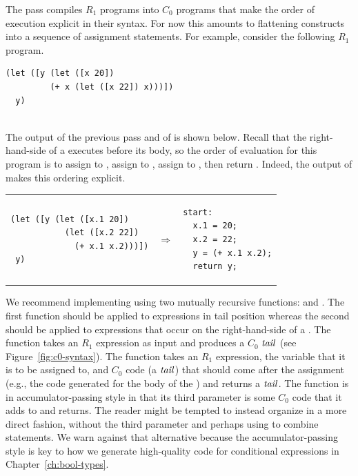 \documentclass[11pt]{book}
\begin{document}
The  pass compiles $R_1$ programs into $C_0$
programs that make the order of execution explicit in their
syntax. For now this amounts to flattening  constructs into a
sequence of assignment statements. For example, consider the following
$R_1$ program.\\
\begin{minipage}{0.96\textwidth}
\begin{lstlisting}
(let ([y (let ([x 20])
         (+ x (let ([x 22]) x)))])
  y)
\end{lstlisting}
\end{minipage}\\
%
The output of the previous pass and of  is
shown below. Recall that the right-hand-side of a  executes
before its body, so the order of evaluation for this program is to
assign  to , assign  to , assign
 to , then return . Indeed, the
output of  makes this ordering explicit.\\
\begin{tabular}{lll}
\begin{minipage}{0.4\textwidth}
\begin{lstlisting}
(let ([y (let ([x.1 20]) 
           (let ([x.2 22])
             (+ x.1 x.2)))])
 y)
\end{lstlisting}
\end{minipage}
&
$\Rightarrow$
&
\begin{minipage}{0.4\textwidth}
\begin{lstlisting}
start:
  x.1 = 20;
  x.2 = 22;
  y = (+ x.1 x.2);
  return y;
\end{lstlisting}
\end{minipage}
\end{tabular}

We recommend implementing  using two mutually
recursive functions:  and
.  The first function should be applied to
expressions in tail position whereas the second should be applied to
expressions that occur on the right-hand-side of a .
%
The  function takes an $R_1$ expression as input
and produces a $C_0$ $\mathit{tail}$ (see Figure~\ref{fig:c0-syntax}).
%
The  function takes an $R_1$ expression, the
variable that it is to be assigned to, and $C_0$ code (a $\mathit{tail}$) that
should come after the assignment (e.g., the code generated for the
body of the ) and returns a $\mathit{tail}$. The
 function is in accumulator-passing style in
that its third parameter is some $C_0$ code that it adds to and
returns. The reader might be tempted to instead organize
 in a more direct fashion, without the third
parameter and perhaps using  to combine statements. We
warn against that alternative because the accumulator-passing style is
key to how we generate high-quality code for conditional expressions
in Chapter~\ref{ch:bool-types}.
\end{document}
